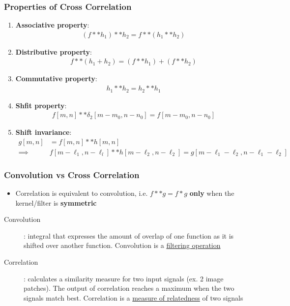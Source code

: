 \documentclass[letterpaper,12pt]{article}
\begin{document}
\subsubsection{Properties of Cross Correlation}
\begin{enumerate}
 \item \textbf{Associative property}:
       \begin{align}
        (f**h_1)**h_2 = f**(h_1 ** h_2)
       \end{align}
 \item \textbf{Distributive property}:
       \begin{align}
        f**(h_1 + h_2) = (f**h_1) + (f**h_2)
       \end{align}
 \item \textbf{Commutative property}:
       \begin{align}
        h_1 ** h_2 = h_2 ** h_1
       \end{align}
 \item \textbf{Shfit property}:
       \begin{align}
        f[m,n] ** \delta_2[m-m_0,n-n_0] = f[m-m_0,n-n_0]
       \end{align}
 \item \textbf{Shift invariance}:
       \begin{align}
        g[m,n]   & = f[m,n] ** h[m,n]                            \\
        \implies & f[m-\ell_1,n-\ell_l] ** h[m-\ell_2, n-\ell_2]
        = g[m-\ell_1 - \ell_2, n-\ell_1 -\ell_2]
       \end{align}
\end{enumerate}

\subsubsection{Convolution vs Cross Correlation}
\begin{itemize}
 \item Correlation is equivalent to convolution, i.e. $f**g = f*g$ \textbf{only} when the kernel/filter is \textbf{symmetric}
\end{itemize}
\begin{description}
 \item[Convolution]: integral that expresses the amount of overlap of one function as it is shifted over another function. Convolution is a \underline{filtering operation}
 \item[Correlation]: calculates a similarity measure for two input signals (ex. 2 image patches). The output of correlation reaches a maximum when the two signals match best. Correlation is a \underline{measure of relatedness} of two signals
\end{description}
\end{document}
